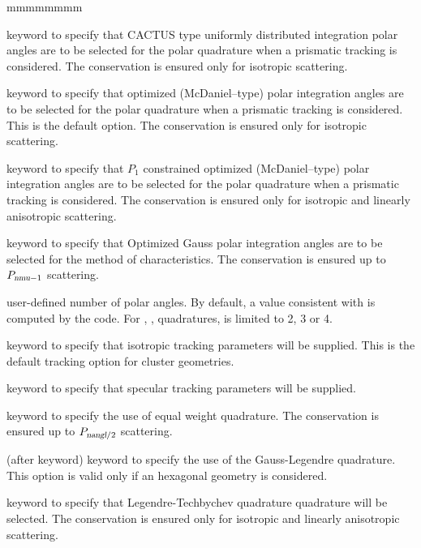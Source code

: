 \begin{ListeDeDescription}{mmmmmmmm}
\item[\moc{CACB}] keyword to specify that CACTUS type uniformly distributed integration polar angles
are to be selected for the polar quadrature when a prismatic tracking is considered.\cite{CACTUS} The conservation is ensured only for isotropic scattering.

\item[\moc{LCMD}] keyword to specify that optimized (McDaniel--type) polar integration angles are to be
selected for the polar quadrature when a prismatic tracking is considered.\cite{LCMD} This is the default option. The conservation is ensured only for isotropic scattering.

\item[\moc{OPP1}] keyword to specify that $P_1$ constrained optimized (McDaniel--type) polar integration angles are to be selected for the polar quadrature when a prismatic tracking is considered.\cite{LeTellierpa} The conservation is ensured only for isotropic and linearly anisotropic scattering.

\item[\moc{OGAU}] keyword to specify that Optimized Gauss polar integration angles are to be
selected for the method of characteristics.\cite{LCMD,LeTellierpa} The conservation is ensured up to $P_{\dusa{nmu}-1}$ scattering.

\item[\dusa{nmu}]  user-defined number of polar angles. By default, a value consistent with  is computed by the code. For , ,  quadratures,  is limited to 2, 3 or 4.

\item[\moc{TISO}] keyword to specify that isotropic tracking parameters will be supplied. This is the
default tracking option for cluster geometries. 

\item[\moc{TSPC}] keyword to specify that specular tracking parameters will be supplied.

\item[\moc{EQW}] keyword to specify the use of equal weight quadrature.\cite{eqn} The conservation is ensured up to $P_{\dusa{nangl}/2}$ scattering.

\item[\moc{GAUS}] (after  keyword) keyword to specify the use of the Gauss-Legendre quadrature. This option is valid only if an 
hexagonal geometry is considered.

\item[\moc{PNTN}] keyword to specify that Legendre-Techbychev quadrature quadrature will be selected.\cite{pntn} The conservation is ensured only for isotropic and linearly anisotropic scattering.


\end{ListeDeDescription}

